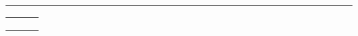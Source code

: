 \begin{titlepage}
{	\Huge \docTitle
	
	\vspace{0.05in}
	\hrule
	\vspace{0.4in}
	
	\large \teamnumber
	
	\vspace{0.1in}
}

\begin{minipage}[c]{\linewidth}
			\large
			\centering
			\begin{tabular}{l c c}
				\studentAname & \studentAmid & \studentAsid \\
				\studentBname & \studentBmid & \studentBsid \\
				\studentCname & \studentCmid & \studentCsid \\
			\end{tabular}
\end{minipage}


%		
%


\end{titlepage}